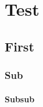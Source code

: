 \documentclass{memoir}
\begin{document}
\chapter{Test}
\section{First}
\subsection{Sub}
\subsubsection{Subsub}
\end{document}
